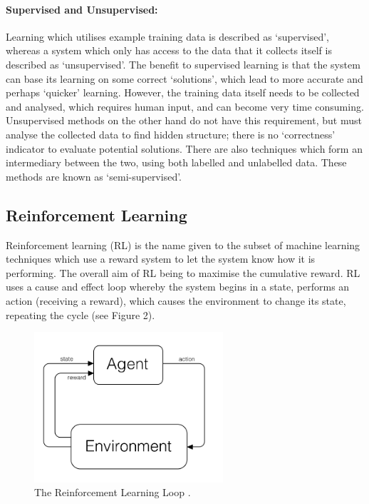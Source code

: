 \documentclass[a4paper,oneside]{report}
\begin{document}
\paragraph{Supervised and Unsupervised:} Learning which utilises example training data is described as `supervised', whereas a system which only has access to the data that it collects itself is described as `unsupervised'. The benefit to supervised learning is that the system can base its learning on some correct `solutions', which lead to more accurate and perhaps `quicker' learning. However, the training data itself needs to be collected and analysed, which requires human input, and can become very time consuming. Unsupervised methods on the other hand do not have this requirement, but must analyse the collected data to find hidden structure; there is no `correctness' indicator to evaluate potential solutions. There are also techniques which form an intermediary between the two, using both labelled and unlabelled data. These methods are known as `semi-supervised'.

\subsection{Reinforcement Learning}

Reinforcement learning (RL) is the name given to the subset of machine learning techniques which use a reward system to let the system know how it is performing. The overall aim of RL being to maximise the cumulative reward. RL uses a cause and effect loop whereby the system begins in a state, performs an action (receiving a reward), which causes the environment to change its state, repeating the cycle (see Figure 2).

\begin{figure}[h!]
  \centering
    \includegraphics[width=70mm]{sources/images/RLDiagram}
    \caption{The Reinforcement Learning Loop \cite{Nilsson:2010qa}.\label{screen}}
\end{figure}
\end{document}
